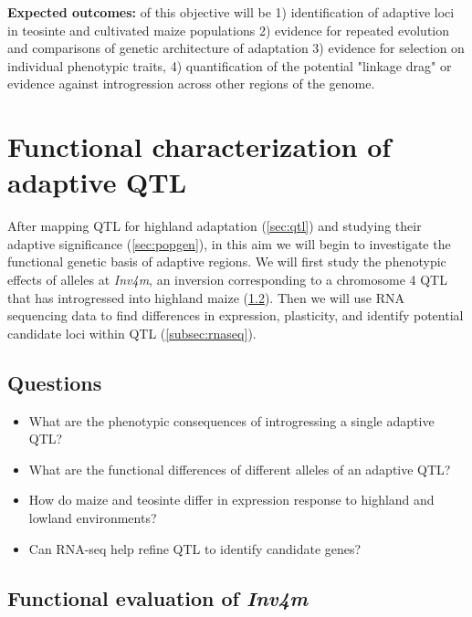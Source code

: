 {\bf Expected outcomes:}  of this objective will be 1) identification of adaptive loci in teosinte and cultivated maize populations 2) evidence for repeated evolution and comparisons of genetic architecture of adaptation 3) evidence for selection on individual phenotypic traits, 4) quantification of the potential "linkage drag" or evidence against introgression across other regions of the genome.

\section{Functional characterization of adaptive QTL} \label{sec:funchar}

After mapping QTL for highland adaptation (\ref{sec:qtl}) and studying their adaptive significance (\ref{sec:popgen}), in this aim we will begin to investigate the functional genetic basis of adaptive regions.  We will first study the phenotypic effects of alleles at \emph{Inv4m}, an inversion corresponding to a chromosome 4 QTL that has introgressed into highland maize  (\ref{subsec:nils}).  Then we will use RNA sequencing data to find differences in expression, plasticity, and identify potential candidate loci within QTL (\ref{subsec:rnaseq}).

\subsection{Questions}
\begin{itemize}[topsep=0pt,itemsep=-1ex,partopsep=1ex,parsep=1ex]
\item What are the phenotypic consequences of introgressing a single adaptive QTL?
\item What are the functional differences of different alleles of an adaptive QTL?
\item How do maize and teosinte differ in expression response to highland and lowland environments?
\item Can RNA-seq help refine QTL to identify candidate genes?
\end{itemize}

\subsection{Functional evaluation of \emph{Inv4m}} \label{subsec:nils}

